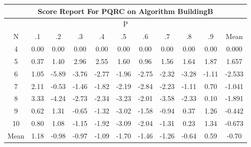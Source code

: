 \documentclass[11pt,a4paper]{report}
\begin{document}
\begin{longtable}{ | c || c | c | c | c | c | c | c | c | c || c |}
\hline
\multicolumn{11}{|c|}{ Score Report For PQRC on Algorithm BuildingB} \\
\hline
\multicolumn{11}{|c|}{ P } \\
\hline
N & .1 & .2 & .3 & .4 & .5 & .6 & .7 & .8 & .9 & Mean\\
 \hline
 \hline
 \endhead
  4 &  \cellcolor[HTML]{FFFFFF} 0.00 &  \cellcolor[HTML]{FFFFFF} 0.00 &  \cellcolor[HTML]{FFFFFF} 0.00 &  \cellcolor[HTML]{FFFFFF} 0.00 &  \cellcolor[HTML]{FFFFFF} 0.00 &  \cellcolor[HTML]{FFFFFF} 0.00 &  \cellcolor[HTML]{FFFFFF} 0.00 &  \cellcolor[HTML]{FFFFFF} 0.00 &  \cellcolor[HTML]{FFFFFF} 0.00 & 0.000 \\
  5 &  \cellcolor[HTML]{F7F7FF} 0.37 &  \cellcolor[HTML]{DFDFFF} 1.40 &  \cellcolor[HTML]{B7B7FF} 2.96 &  \cellcolor[HTML]{BFBFFF} 2.55 &  \cellcolor[HTML]{D7D7FF} 1.60 &  \cellcolor[HTML]{E7E7FF} 0.96 &  \cellcolor[HTML]{D7D7FF} 1.56 &  \cellcolor[HTML]{D7D7FF} 1.64 &  \cellcolor[HTML]{CFCFFF} 1.87 & 1.657 \\
  6 &  \cellcolor[HTML]{E7E7FF} 1.05 &  \cellcolor[HTML]{FF6868} -5.89 &  \cellcolor[HTML]{FF9F9F} -3.76 &  \cellcolor[HTML]{FFB7B7} -2.77 &  \cellcolor[HTML]{FFCFCF} -1.96 &  \cellcolor[HTML]{FFB7B7} -2.75 &  \cellcolor[HTML]{FFC7C7} -2.32 &  \cellcolor[HTML]{FFAFAF} -3.28 &  \cellcolor[HTML]{FFE7E7} -1.11 & -2.533 \\
  7 &  \cellcolor[HTML]{C7C7FF} 2.11 &  \cellcolor[HTML]{FFEFEF} -0.53 &  \cellcolor[HTML]{FFD7D7} -1.46 &  \cellcolor[HTML]{FFCFCF} -1.82 &  \cellcolor[HTML]{FFC7C7} -2.19 &  \cellcolor[HTML]{FFB7B7} -2.84 &  \cellcolor[HTML]{FFC7C7} -2.23 &  \cellcolor[HTML]{FFDFDF} -1.11 &  \cellcolor[HTML]{EFEFFF} 0.70 & -1.041 \\
  8 &  \cellcolor[HTML]{AFAFFF} 3.33 &  \cellcolor[HTML]{FF9797} -4.24 &  \cellcolor[HTML]{FFB7B7} -2.73 &  \cellcolor[HTML]{FFC7C7} -2.34 &  \cellcolor[HTML]{FFAFAF} -3.23 &  \cellcolor[HTML]{FFCFCF} -2.01 &  \cellcolor[HTML]{FFA7A7} -3.58 &  \cellcolor[HTML]{FFC7C7} -2.33 &  \cellcolor[HTML]{FFFFFF} 0.10 & -1.891 \\
  9 &  \cellcolor[HTML]{EFEFFF} 0.62 &  \cellcolor[HTML]{DFDFFF} 1.31 &  \cellcolor[HTML]{FFEFEF} -0.65 &  \cellcolor[HTML]{FFDFDF} -1.32 &  \cellcolor[HTML]{FFAFAF} -3.02 &  \cellcolor[HTML]{FFD7D7} -1.58 &  \cellcolor[HTML]{FFE7E7} -0.94 &  \cellcolor[HTML]{F7F7FF} 0.37 &  \cellcolor[HTML]{DFDFFF} 1.26 & -0.442 \\
  10 &  \cellcolor[HTML]{E7E7FF} 0.80 &  \cellcolor[HTML]{E7E7FF} 1.08 &  \cellcolor[HTML]{FFDFDF} -1.15 &  \cellcolor[HTML]{FFCFCF} -1.92 &  \cellcolor[HTML]{FFAFAF} -3.09 &  \cellcolor[HTML]{FFCFCF} -2.04 &  \cellcolor[HTML]{FFDFDF} -1.31 &  \cellcolor[HTML]{F7F7FF} 0.23 &  \cellcolor[HTML]{DFDFFF} 1.34 & -0.673 \\
 \hline
 \hline
Mean &  \cellcolor[HTML]{DFDFFF} 1.18 &  \cellcolor[HTML]{FFE7E7} -0.98 &  \cellcolor[HTML]{FFE7E7} -0.97 &  \cellcolor[HTML]{FFE7E7} -1.09 &  \cellcolor[HTML]{FFD7D7} -1.70 &  \cellcolor[HTML]{FFD7D7} -1.46 &  \cellcolor[HTML]{FFDFDF} -1.26 &  \cellcolor[HTML]{FFEFEF} -0.64 &  \cellcolor[HTML]{EFEFFF} 0.59 &  \cellcolor[HTML]{FFEFEF} -0.70
\end{longtable}
\end{document}

